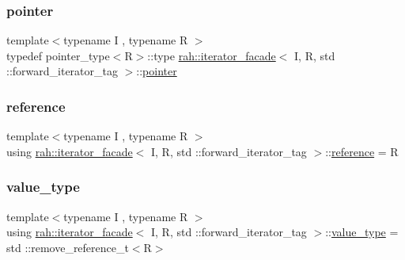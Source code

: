 \subsubsection{\texorpdfstring{pointer}{pointer}}
{\footnotesize\ttfamily template$<$typename I , typename R $>$ \\
typedef pointer\+\_\+type$<$R$>$\+::type \mbox{\hyperlink{structrah_1_1iterator__facade}{rah\+::iterator\+\_\+facade}}$<$ I, R, std \+::forward\+\_\+iterator\+\_\+tag $>$\+::\mbox{\hyperlink{structrah_1_1iterator__facade_3_01_i_00_01_r_00_01std_01_1_1forward__iterator__tag_01_4_a40719192500f32f440a6c838e29ada32}{pointer}}}

\mbox{\label{structrah_1_1iterator__facade_3_01_i_00_01_r_00_01std_01_1_1forward__iterator__tag_01_4_afc82a925c7d3fa3959bc9e8fc96dc582}} 
\subsubsection{\texorpdfstring{reference}{reference}}
{\footnotesize\ttfamily template$<$typename I , typename R $>$ \\
using \mbox{\hyperlink{structrah_1_1iterator__facade}{rah\+::iterator\+\_\+facade}}$<$ I, R, std \+::forward\+\_\+iterator\+\_\+tag $>$\+::\mbox{\hyperlink{structrah_1_1iterator__facade_3_01_i_00_01_r_00_01std_01_1_1forward__iterator__tag_01_4_afc82a925c7d3fa3959bc9e8fc96dc582}{reference}} =  R}

\mbox{\label{structrah_1_1iterator__facade_3_01_i_00_01_r_00_01std_01_1_1forward__iterator__tag_01_4_a382051259e4c6ce57365cbdd02e6536e}} 
\subsubsection{\texorpdfstring{value\_type}{value\_type}}
{\footnotesize\ttfamily template$<$typename I , typename R $>$ \\
using \mbox{\hyperlink{structrah_1_1iterator__facade}{rah\+::iterator\+\_\+facade}}$<$ I, R, std \+::forward\+\_\+iterator\+\_\+tag $>$\+::\mbox{\hyperlink{structrah_1_1iterator__facade_3_01_i_00_01_r_00_01std_01_1_1forward__iterator__tag_01_4_a382051259e4c6ce57365cbdd02e6536e}{value\+\_\+type}} =  std \+::remove\+\_\+reference\+\_\+t$<$R$>$}



